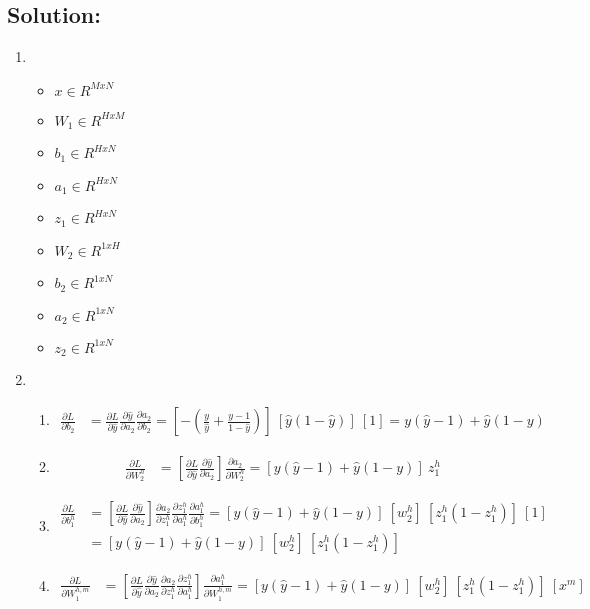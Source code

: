 \documentclass[submit]{harvardml}
\begin{document}
\subsection*{Solution:}
\begin{enumerate}
    \item 
    \begin{itemize}
        \item $x \in R^{Mx N} $
        \item $W_1 \in R^{HxM} $
        \item $b_1 \in R^{HxN}$
        \item $a_1 \in R^{HxN}$
        \item $z_1 \in R^{HxN}$
        \item $W_2 \in R^{1xH}$
        \item $b_2 \in R^{1xN}$
        \item $a_2 \in R^{1xN}$
        \item $z_2 \in R^{1xN}$
    \end{itemize}
    
    \item
    \begin{enumerate}
        \item 
        \begin{align}
            \frac{\partial L}{\partial b_2} &= \frac{\partial L}{\partial \hat y}\frac{\partial \hat y}{\partial a_2} \frac{\partial a_2}{\partial b_2} = [-(\frac{y}{\hat y} + \frac{y-1}{1-\hat y})] \ [\hat y (1 - \hat y)] \ [1] = y(\hat y - 1) + \hat y (1 - y)
        \end{align}
        \item 
        \begin{align}
            \frac{\partial L}{\partial W_2^h} &= [\frac{\partial L}{\partial \hat y}\frac{\partial \hat y}{\partial a_2}] \frac{\partial a_2}{\partial W_2^h} = [y(\hat y - 1) + \hat y (1 - y)] \ z_1^h
        \end{align}
        \item
        \begin{align}
            \frac{\partial L}{\partial b_1^h} &= [\frac{\partial L}{\partial \hat y}\frac{\partial \hat y}{\partial a_2} ] \frac{\partial a_2}{\partial z_1^h} \frac{\partial z_1^h}{\partial a_1^h} \frac{\partial a_1^h }{\partial b_1^h} = [y(\hat y - 1) + \hat y (1 - y)] \ [w_2^h] \ [z_1^h (1 - z_1^h)] \ [1] \\
            &= [y(\hat y - 1) + \hat y (1 - y)] \ [w_2^h] \ [z_1^h (1 - z_1^h)]
        \end{align}
        \item 
        \begin{align}
            \frac{\partial L}{\partial W_1^{h,m}} &= [\frac{\partial L}{\partial \hat y}\frac{\partial \hat y}{\partial a_2}  \frac{\partial a_2}{\partial z_1^h} \frac{\partial z_1^h}{\partial a_1^h}] \frac{\partial a_1^h }{\partial W_1^{h,m}} = [y(\hat y - 1) + \hat y (1 - y)] \ [w_2^h] \ [z_1^h (1 - z_1^h)] \ [x^m]
        \end{align}
    \end{enumerate}
\end{enumerate}
\end{document}
